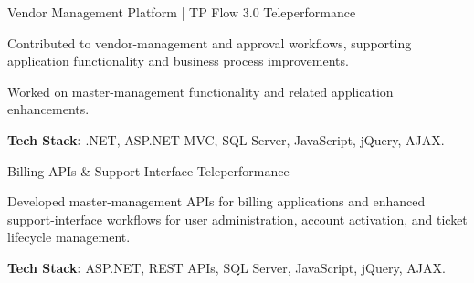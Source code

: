 \begin{cventries}
  \cventry
    {Vendor Management Platform \textnormal{| TP Flow 3.0}}
    {Teleperformance}
    {
      \begin{cvitems}
        \item {Contributed to vendor-management and approval workflows, supporting application functionality and business process improvements.}
        \item {Worked on master-management functionality and related application enhancements.}
        \item {\textbf{Tech Stack:} .NET, ASP.NET MVC, SQL Server, JavaScript, jQuery, AJAX.}
      \end{cvitems}
    }

  \cventry
    {Billing APIs \& Support Interface}
    {Teleperformance}
    {
      \begin{cvitems}
        \item {Developed master-management APIs for billing applications and enhanced support-interface workflows for user administration, account activation, and ticket lifecycle management.}
        \item {\textbf{Tech Stack:} ASP.NET, REST APIs, SQL Server, JavaScript, jQuery, AJAX.}
      \end{cvitems}
    }

\end{cventries}
